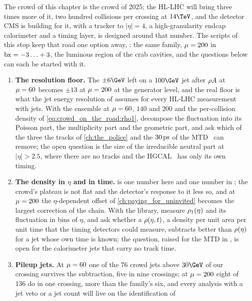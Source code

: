 The crowd of this chapter is the crowd of 2025; the HL-LHC will bring
three times more of it, two hundred collisions per crossing at $14\TeV$,
and the detector CMS is building for it, with a tracker to $|\eta|=4$, a
high-granularity endcap calorimeter and a timing layer, is designed
around that number. The scripts of this stop keep that road one option
away, : the same family, $\mu=200$ in
$\mathrm{bx}=-3\ldots+3$, the luminous region of the crab cavities, and the
questions below can each be started with it.
\begin{enumerate}
  \item \textbf{The resolution floor.} The $\pm6\GeV$ left on a
    $100\GeV$ jet after $\rho A$ at $\mu=60$ becomes $\pm13$ at
    $\mu=200$ at the generator level, and the real floor is what the jet
    energy resolution of \cite{Azzi:2019yne} assumes for every HL-LHC
    measurement with jets. With the ensemble at $\mu=60$, $140$ and
    $200$ and the per-collision density of
    \cref{eq:crowd_on_the_road:rho1}, decompose the fluctuation into its
    Poisson part, the multiplicity part and the geometric part, and ask
    which of the three the tracks of \cref{ch:the_police} and the
    $30\,\mathrm{ps}$ of the MTD~\cite{Butler:2019rpu} can remove; the open
    question is the size of the irreducible neutral part at $|\eta|>2.5$,
    where there are no tracks and the HGCAL~\cite{CMS:2017jpq} has only
    its own timing.
  \item \textbf{The density in $\eta$ and in time.} \rhoPU is one number
    here and one number in \CMSSW; the crowd's plateau is not flat and
    the detector's response to it less so, and at $\mu=200$ the
    $\eta$-dependent offset of \cref{ch:paying_for_uninvited} becomes
    the largest correction of the chain. With the library, measure
    $\rho_1(\eta)$ and its fluctuation in bins of $\eta$, and ask
    whether a $\rho(\eta,t)$, a density per unit area per unit time
    that the timing detectors could measure, subtracts better than
    $\rho(\eta)$ for a jet whose own time is known; the question, raised
    for the MTD in \cite{Butler:2019rpu}, is open for the calorimeter jets
    that carry no track time.
  \item \textbf{Pileup jets.} At $\mu=60$ one of the $76$ crowd jets
    above $30\GeV$ of our crossing survives the subtraction, five in nine
    crossings; at $\mu=200$ eight of $136$ do in one crossing, more than
    the family's six, and every analysis with a jet veto or
    a jet count will live on the identification of

\end{enumerate}
